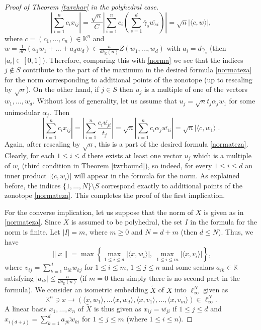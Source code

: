 \documentclass[12pt, reqno]{amsart}
\theoremstyle{definition}
\theoremstyle{remark}
\numberwithin{equation}{section}
\begin{document}
\begin{proof}[Proof of Theorem \ref{twrchar} in the polyhedral case]
$$\left | \sum_{i=1}^{n} c_ix_{ij} \right | = \frac{\sqrt{n}}{C} \left | \sum_{i=1}^{n} c_i \left ( \sum_{s=1}^d \overline{\gamma}_{s}\overline{w_{si}} \right ) \right | = \sqrt{n} \left | \langle c, w \rangle \right |,$$
where $c=(c_1, \ldots, c_n) \in \mathbb{K}^n$ and $w = \frac{1}{dC}(a_1w_1 + \ldots + a_dw_d) \in \frac{n}{d\delta_{\mathbb{K}}(n)} Z(w_1, \ldots, w_d)$ with $a_i = d \gamma_i$ (then $|a_i| \in [0, 1]$). Therefore, comparing this with \eqref{norma} we see that the indices $j \not \in S$ contribute to the part of the maximum in the desired formula \eqref{normateza} for the norm corresponding to additional points of the zonotope (up to rescaling by $\sqrt{n}$). On the other hand, if $j \in S$ then $u_j$ is a multiple of one of the vectors $w_1, \ldots, w_d$. Without loss of generality, let us assume that $u_j=\sqrt{n}t_j \alpha_j w_1$ for some unimodular $\alpha_j$. Then
$$\left | \sum_{i=1}^{n} c_ix_{ij} \right | = \left | \sum_{i=1}^{n} \frac{c_i\overline{u_{ji}}}{t_j} \right | = \sqrt{n} \left | \sum_{i=1}^{n} c_i\alpha_j\overline{w_{1i}} \right | = \sqrt{n} | \langle c, w_1 \rangle |.$$
Again, after rescaling by $\sqrt{n}$, this is a part of the desired formula \eqref{normateza}. Clearly, for each $1 \leq i \leq d$ there exists at least one vector $u_j$ which is a multiple of $w_i$ (third condition in Theorem \ref{twrbound}), so indeed, for every $1 \leq i \leq d$ an inner product $|\langle c, w_i \rangle|$ will appear in the formula for the norm. As explained before, the indices $\{1, \ldots, N \} \setminus S$ correspond exactly to additional points of the zonotope \eqref{normateza}. This completes the proof of the first implication.

For the converse implication, let us suppose that the norm of $X$ is given as in \eqref{normateza}. Since $X$ is assumed to be polyhedral, the set $I$ in the formula for the norm is finite. Let $|I|=m$, where $m \geq 0$ and $N=d+m$ (then $d \leq N$). Thus, we have
$$\|x\| =  \max \left \{ \max_{1 \leq i \leq d} | \langle x, w_i \rangle |, \: \max_{1 \leq i \leq m} |\langle x, v_i \rangle| \right \},$$
where $v_{ij} = \sum_{k=1}^{d} a_{ik}w_{kj}$ for $1 \leq i \leq m$, $1 \leq j \leq n$ and some scalars $a_{ik} \in \mathbb{K}$ satisfying $|a_{ik}| \leq \frac{n}{d\delta_{\mathbb{K}}(n)}$ (if $m=0$ then simply there is no second part in the formula). We consider an isometric embedding $\widetilde{X}$ of $X$ into $\ell_{\infty}^N$ given as
$$\mathbb{K}^n \ni x \to (\langle x, w_1 \rangle, \ldots \langle x, w_d \rangle, \langle x, v_1 \rangle, \ldots, \langle x, v_m \rangle ) \in \ell_{\infty}^N.$$
A linear basis $x_1, \ldots, x_n$ of $\widetilde{X}$ is thus given as $x_{ij} = \overline{w_{ji}}$ if $1 \leq j \leq d$ and $x_{i(d+j)} = \sum_{k=1}^{d} \overline{a_{jk}w_{ki}}$ for $1 \leq j \leq m$ (where $1 \leq i \leq n$).


\end{proof}
\end{document}
